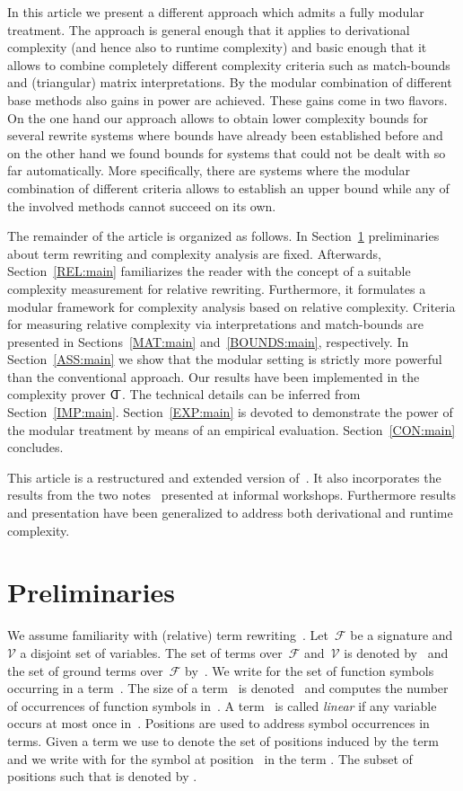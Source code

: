 \documentclass{LMCS}
\theoremstyle{plain}\newtheorem{mainthm}[thm]{Main Theorem}
\newcommand\SIG[1]{\ensuremath{\mathcal{#1}}}
\newcommand\VAR[1]{\ensuremath{\mathcal{#1}}}
\newcommand\CAT{\ensuremath{\mathsf {C\kern-0.25em\raisebox{0.14em}{}\kern-0.2emT}}\xspace }
\begin{document}
In this article we present a different approach which admits a fully
modular treatment. The approach is general enough that it applies to
derivational complexity (and hence also to runtime complexity) and
basic enough that it allows to combine completely different complexity
criteria such as match-bounds and (triangular) matrix interpretations.
By the modular combination of different base methods also gains in power
are achieved. These gains come in two flavors. On the one hand our approach
allows to obtain lower complexity bounds for several rewrite systems where
bounds have already been established before and on the other hand we
found bounds for systems that could not be dealt with so far automatically.
More specifically, there are systems where the modular combination of
different criteria allows to establish an upper bound while any of the
involved methods cannot succeed on its own.

The remainder of the article is organized as follows. In
Section~\ref{PRE:main} preliminaries about term rewriting and complexity
analysis are fixed.
Afterwards, Section~\ref{REL:main} familiarizes the reader with the
concept of a suitable complexity measurement for relative rewriting.
Furthermore, it
formulates a modular framework for complexity analysis
based on relative complexity.
Criteria for measuring relative complexity via interpretations and
match-bounds are presented in Sections~\ref{MAT:main}
and~\ref{BOUNDS:main}, respectively.
In Section~\ref{ASS:main}
we show that the modular setting is strictly more powerful than the
conventional approach. Our results have been implemented in the complexity
prover \CAT. The technical details can be inferred from
Section~\ref{IMP:main}. Section~\ref{EXP:main} is devoted to demonstrate
the power of the modular treatment by means of an empirical evaluation.
Section~\ref{CON:main} concludes.

This article is a restructured and extended version of~\cite{ZK10}. It also
incorporates the results from the two notes~\cite{ZK10a,ZK10b} presented at
informal workshops. Furthermore results and presentation have been generalized
to address both derivational and runtime complexity.

\section{Preliminaries}
\label{PRE:main}

We assume familiarity with (relative) term rewriting~\cite{BN98,G90,TERESE}.
Let~\SIG{F} be a signature and~\VAR{V} a disjoint set of variables.
The set of terms over~\SIG{F} and~\VAR{V} is denoted by~ and
the set of ground terms over~\SIG{F} by~.
We write  for the set of function symbols occurring in a term~.
The size of a term~ is denoted~ and  computes the
number of occurrences of function symbols in~.
A term~ is called \emph{linear} if any variable~ occurs at most
once in~. 
Positions are used to address symbol occurrences in terms. Given a term 
we use  to denote the set of positions induced by the term  and
we write  with  for the symbol at position~ in the term
. The subset of positions  such that 
is denoted by .
\end{document}
